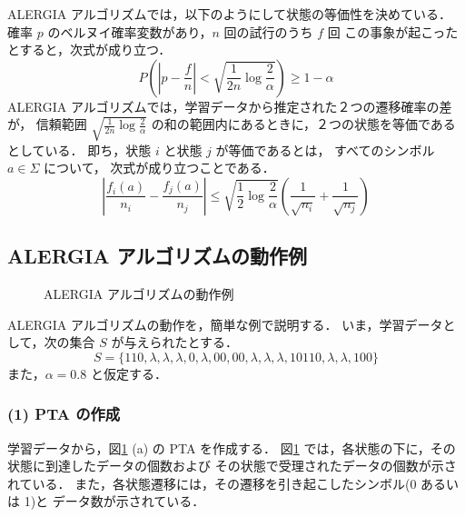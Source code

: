 ALERGIA アルゴリズムでは，以下のようにして状態の等価性を決めている．
確率 $p$ のベルヌイ確率変数があり，$n$ 回の試行のうち $f$ 回
この事象が起こったとすると，次式が成り立つ．
\begin{equation}
        P \left ( \left | p - \frac{f}{n} \right | < \sqrt{\frac{1}{2n} \log \frac{2}{\alpha}} \right ) \geq 1 - \alpha
\end{equation}
ALERGIA アルゴリズムでは，学習データから推定された２つの遷移確率の差が，
信頼範囲 $\sqrt{\frac{1}{2n} \log \frac{2}{\alpha}}$
の和の範囲内にあるときに，２つの状態を等価であるとしている．
即ち，状態 $i$ と状態 $j$ が等価であるとは，
すべてのシンボル $a \in \Sigma$ について，
次式が成り立つことである．
\begin{equation}
        \left | \frac{f_{i}(a)}{n_{i}} - \frac{f_{j}(a)}{n_{j}} \right |
        \leq \sqrt{\frac{1}{2} \log \frac{2}{\alpha}}
                \left ( \frac{1}{\sqrt{n_{i}}} + \frac{1}{\sqrt{n_{j}}} \right )
\label{Eq:AlergiaStateEq}
\end{equation}

\subsection{ALERGIA アルゴリズムの動作例}

\begin{figure}
\begin{center}
\end{center}
\caption{ALERGIA アルゴリズムの動作例}
\label{Fig:ExampleAlergia}
\end{figure}

ALERGIA アルゴリズムの動作を，簡単な例で説明する\cite{Carrasco94}．
いま，学習データとして，次の集合 $S$ が与えられたとする．
\begin{equation}
  S = \{ 110, \lambda, \lambda, \lambda, 0, \lambda, 00, 00,
        \lambda, \lambda, \lambda, 10110, \lambda, \lambda, 100 \}
\end{equation}
また，$\alpha = 0.8$ と仮定する．

\subsubsection*{(1) PTA の作成}

学習データから，図\ref{Fig:ExampleAlergia} (a) の PTA を作成する．
図\ref{Fig:ExampleAlergia} では，各状態の下に，その状態に到達したデータの個数および
その状態で受理されたデータの個数が示されている．
また，各状態遷移には，その遷移を引き起こしたシンボル(0 あるいは 1)と
データ数が示されている．

